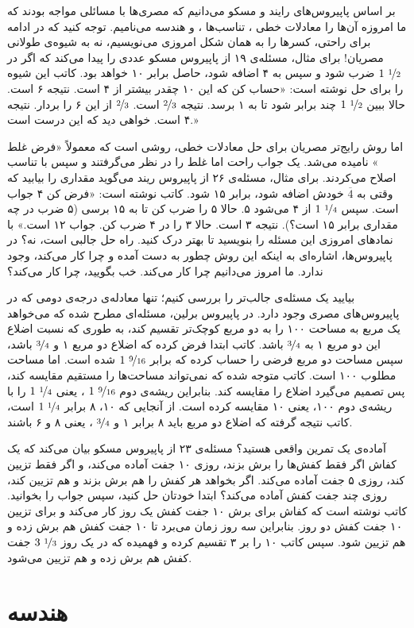 بر اساس پاپیروس‌های رایند و مسکو می‌دانیم که مصری‌ها با مسائلی مواجه بودند که ما امروزه آن‌ها را معادلات خطی%
،
تناسب‌ها%
،
و هندسه%
 می‌نامیم. توجه کنید که در ادامه برای راحتی، کسرها را به همان شکل امروزی می‌نویسیم، نه به شیوه‌ی طولانی مصریان! برای مثال، مسئله‌ی ۱۹ از پاپیروس مسکو عددی را پیدا می‌کند که اگر در
 $1 \ \nicefrac{1}{2}$
 ضرب شود و سپس به ۴ اضافه شود، حاصل برابر ۱۰ خواهد بود. کاتب این شیوه را برای حل نوشته است: «حساب کن که این ۱۰ چقدر بیشتر از ۴ است. نتیجه ۶ است. حالا ببین
 $1 \ \nicefrac{1}{2}$
 چند برابر شود تا به ۱ برسد. نتیجه $\nicefrac{2}{3}$ است.
 $\nicefrac{2}{3}$
 از این ۶ را بردار. نتیجه ۴ است. خواهی دید که این درست است.»
 
 اما روش رایج‌تر مصریان برای حل معادلات خطی، روشی است که معمولاً «فرض غلط%
 »
 نامیده می‌شد. یک جواب راحت اما غلط را در نظر می‌گرفتند و سپس با تناسب اصلاح می‌کردند. برای مثال، مسئله‌ی ۲۶ از پاپیروس ریند می‌گوید مقداری را بیابید که وقتی به
 $\overline{4}$
 خودش اضافه شود، برابر ۱۵ شود. کاتب نوشته است: «فرض کن ۴ جواب است. سپس
 $1 \ \nicefrac{1}{4}$
 از ۴ می‌شود ۵. حالا ۵ را ضرب کن تا به ۱۵ برسی (۵ ضرب در چه مقداری برابر ۱۵ است؟). نتیجه ۳ است. حالا ۳ را در ۴ ضرب کن. جواب ۱۲ است.» با نمادهای امروزی این مسئله را بنویسید تا بهتر درک کنید. راه حل جالبی است، نه؟ در پاپیروس‌ها، اشاره‌ای به اینکه این روش چطور به دست آمده و چرا کار می‌کند، وجود ندارد. ما امروز می‌دانیم چرا کار می‌کند. خب بگویید، چرا کار می‌کند؟
 
 بیایید یک مسئله‌ی جالب‌تر را بررسی کنیم؛ تنها معادله‌ی درجه‌ی دومی که در پاپیروس‌های مصری وجود دارد. در پاپیروس برلین، مسئله‌ای مطرح شده که می‌خواهد یک مربع به مساحت ۱۰۰ را به دو مربع کوچک‌تر تقسیم کند، به طوری که نسبت اضلاع این دو مربع ۱ به
 $\nicefrac{3}{4}$
 باشد. کاتب ابتدا فرض کرده که اضلاع دو مربع ۱ و
 $\nicefrac{3}{4}$
 باشد، سپس مساحت دو مربع فرضی را حساب کرده که برابر
 $1 \ \nicefrac{9}{16}$
 شده است. اما مساحت مطلوب ۱۰۰ است. کاتب متوجه شده که نمی‌تواند مساحت‌ها را مستقیم مقایسه کند، پس تصمیم می‌گیرد اضلاع را مقایسه کند. بنابراین ریشه‌ی دوم
 $1 \ \nicefrac{9}{16}$
 ، یعنی
 $1 \ \nicefrac{1}{4}$
 را با ریشه‌ی دوم ۱۰۰، یعنی ۱۰ مقایسه کرده است. از آنجایی که ۱۰، ۸ برابر
 $1 \ \nicefrac{1}{4}$
 است، کاتب نتیجه گرفته که اضلاع دو مربع باید ۸ برابر ۱ و
 $\nicefrac{3}{4}$
 ، یعنی ۸ و ۶ باشند.
 
 آماده‌ی یک تمرین واقعی هستید؟ مسئله‌ی ۲۳ از پاپیروس مسکو بیان می‌کند که یک کفاش اگر فقط کفش‌ها را برش بزند، روزی ۱۰ جفت آماده می‌کند، و اگر فقط تزیین کند، روزی ۵ جفت آماده می‌کند. اگر بخواهد هر کفش را هم برش بزند و هم تزیین کند، روزی چند جفت کفش آماده می‌کند؟ ابتدا خودتان حل کنید، سپس جواب را بخوانید. کاتب نوشته است که کفاش برای برش ۱۰ جفت کفش یک روز کار می‌کند و برای تزیین ۱۰ جفت کفش دو روز. بنابراین سه روز زمان می‌برد تا ۱۰ جفت کفش هم برش زده و هم تزیین شود. سپس کاتب ۱۰ را بر ۳ تقسیم کرده و فهمیده که در یک روز
$3 \ \nicefrac{1}{3}$
 جفت کفش هم برش زده و هم تزیین می‌شود.
 
 \section{هندسه}
 
